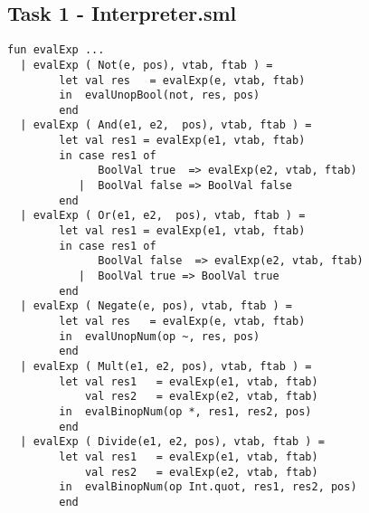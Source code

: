 \documentclass{article}
\begin{document}
\subsection{Task 1 - Interpreter.sml}\label{app:1inter}
\begin{lstlisting}
fun evalExp ...
  | evalExp ( Not(e, pos), vtab, ftab ) =
        let val res   = evalExp(e, vtab, ftab)
        in  evalUnopBool(not, res, pos)
        end
  | evalExp ( And(e1, e2,  pos), vtab, ftab ) =
        let val res1 = evalExp(e1, vtab, ftab)
        in case res1 of
              BoolVal true  => evalExp(e2, vtab, ftab)
           |  BoolVal false => BoolVal false
        end
  | evalExp ( Or(e1, e2,  pos), vtab, ftab ) =
        let val res1 = evalExp(e1, vtab, ftab)
        in case res1 of
              BoolVal false  => evalExp(e2, vtab, ftab)
           |  BoolVal true => BoolVal true
        end
  | evalExp ( Negate(e, pos), vtab, ftab ) =
        let val res   = evalExp(e, vtab, ftab)
        in  evalUnopNum(op ~, res, pos)
        end
  | evalExp ( Mult(e1, e2, pos), vtab, ftab ) =
        let val res1   = evalExp(e1, vtab, ftab)
            val res2   = evalExp(e2, vtab, ftab)
        in  evalBinopNum(op *, res1, res2, pos)
        end
  | evalExp ( Divide(e1, e2, pos), vtab, ftab ) =
        let val res1   = evalExp(e1, vtab, ftab)
            val res2   = evalExp(e2, vtab, ftab)
        in  evalBinopNum(op Int.quot, res1, res2, pos)
        end
\end{lstlisting}
\end{document}
